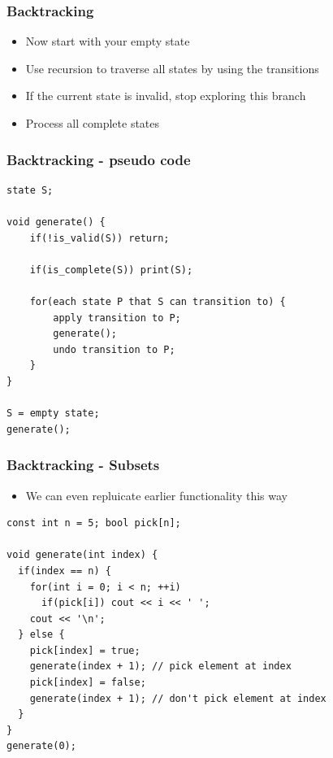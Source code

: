 \documentclass{beamer}
\begin{document}
\begin{frame}[plain]
	\frametitle{Backtracking}
	\begin{itemize}
		 \item Now start with your empty state
		 \item Use recursion to traverse all states by using the transitions
		 \item If the current state is invalid, stop exploring this branch
		 \item Process all complete states
	\end{itemize}
\end{frame}

\begin{frame}
	\frametitle{Backtracking - pseudo code}
	\begin{small}
	\begin{verbatim}
state S;

void generate() {
	if(!is_valid(S)) return;
	
	if(is_complete(S)) print(S);
	
	for(each state P that S can transition to) {
		apply transition to P;
		generate();
		undo transition to P;
	}
}

S = empty state;
generate();
	\end{verbatim}
	\end{small}
\end{frame}

\begin{frame}
	\frametitle{Backtracking - Subsets}
	\begin{itemize}
		 \item We can even repluicate earlier functionality this way
	\end{itemize}
	\begin{small}
	\begin{verbatim}
const int n = 5; bool pick[n];

void generate(int index) {
  if(index == n) {
    for(int i = 0; i < n; ++i)
      if(pick[i]) cout << i << ' ';
    cout << '\n';
  } else {
    pick[index] = true;
    generate(index + 1); // pick element at index
    pick[index] = false;
    generate(index + 1); // don't pick element at index
  }
}
generate(0);
	\end{verbatim}
	\end{small}
\end{frame}
\end{document}
